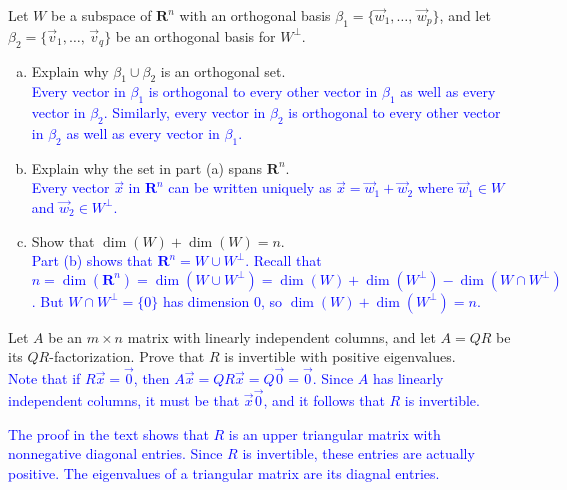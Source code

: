 \documentclass[a4paper,11pt]{article}
\newcommand{\R}{\mathbf{R}}
\newcommand{\blue}[1]{\textcolor{blue}{#1}}
\begin{document}
 Let $W$ be a subspace of $\R^n$ with an
orthogonal basis $\beta_1=\{\vec w_1, \dots,\,\vec w_p\}$, and let
$\beta_2=\{\vec v_1,\dots,\,\vec v_q\}$ be an orthogonal basis for $W^\perp$.
\begin{enumerate}[(a)]
\item Explain why $\beta_1 \cup \beta_2$ is an orthogonal set. \\

  \blue{Every vector in $\beta_1$ is orthogonal to every other vector in
    $\beta_1$ as well as every vector in $\beta_2$. Similarly, every vector in
    $\beta_2$ is orthogonal to every other vector in $\beta_2$ as well as every
    vector in $\beta_1$. \\}

\item Explain why the set in part (a) spans $\R^n$. \\

  \blue{Every vector $\vec x$ in $\R^n$ can be written uniquely as $\vec x =
    \vec w_1 + \vec w_2$ where $\vec w_1 \in W$ and $\vec w_2 \in W^\perp$. \\}

\item Show that $\dim(W)+\dim(W)=n$. \\

  \blue{Part (b) shows that $\R^n = W \cup W^\perp$. Recall that
    $n=\dim(\R^n)=\dim(W \cup W^\perp) = \dim(W) + \dim(W^\perp) - \dim(W \cap
    W^\perp)$. But $W \cap W^\perp = \{0\}$ has dimension 0, so
    $\dim(W)+\dim(W^\perp)=n$. \\}
\end{enumerate}

 Let $A$ be an $m \times n$ matrix with linearly
independent columns, and let $A=QR$ be its $QR$-factorization. Prove that $R$ is
invertible with positive eigenvalues. \\

\blue{Note that if $R\vec x=\vec 0$, then $A \vec x = QR\vec x = Q\vec 0 = \vec
  0$. Since $A$ has linearly independent columns, it must be that $\vec x\vec
  0$, and it follows that $R$ is invertible.}

\blue{The proof in the text shows that $R$ is an upper triangular matrix with
  nonnegative diagonal entries. Since $R$ is invertible, these entries are
  actually positive. The eigenvalues of a triangular matrix are its diagnal
  entries. \\}
\end{document}
